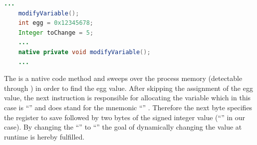  \begin{lstlisting}[language=Java, caption=Self Modifying Code Example, label=self_modifying_code]
    ...
    modifyVariable();
    int egg = 0x12345678;
    Integer toChange = 5;
    ...
    native private void modifyVariable();
    ...
  \end{lstlisting}


The  is a native code method and sweeps
over the process memory (detectable through )
in order to find the egg value. After skipping the assignment of
the egg value, the next instruction is responsible for allocating
the  variable which in this case is ``''
and does stand for the mnemonic ``''
\parencite{bytecode_format}. Therefore the next byte specifies the
register to save followed by two bytes of the signed integer value
(``'' in our case). By changing the ``'' to
``'' the goal of dynamically changing the value at runtime
is hereby fulfilled.

